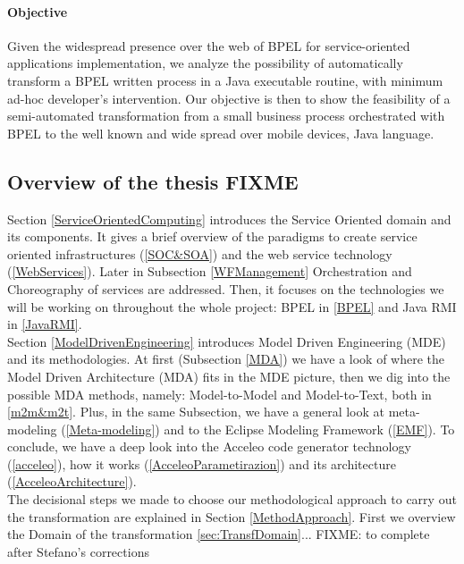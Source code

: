 \paragraph{Objective}
Given the widespread presence over the web of BPEL for service-oriented applications implementation, we analyze the possibility of automatically transform a BPEL written process in a Java executable routine, with minimum ad-hoc developer's intervention.
Our objective is then to show the feasibility of a semi-automated transformation from a small business process orchestrated with BPEL to the well known and wide spread over mobile devices, Java language. 




\subsection{Overview of the thesis FIXME}
Section \ref{ServiceOrientedComputing} introduces the Service Oriented domain and its components. It gives a brief overview of the paradigms to create service oriented infrastructures (\ref{SOC&SOA}) and the web service technology (\ref{WebServices}). Later in Subsection \ref{WFManagement} Orchestration and Choreography of services are addressed. Then, it focuses on the technologies we will be working on throughout the whole project: BPEL in \ref{BPEL} and Java RMI in \ref{JavaRMI}. \\
Section \ref{ModelDrivenEngineering} introduces Model Driven Engineering (MDE) and its methodologies. At first (Subsection \ref{MDA}) we have a look of where the Model Driven Architecture (MDA) fits in the MDE picture, then we dig into the possible MDA methods, namely: Model-to-Model and Model-to-Text, both in \ref{m2m&m2t}. Plus, in the same Subsection, we have a general look at meta-modeling (\ref{Meta-modeling}) and to the Eclipse Modeling Framework (\ref{EMF}). To conclude, we have a deep look into the Acceleo code generator technology (\ref{acceleo}), how it works (\ref{AcceleoParametirazion}) and its architecture (\ref{AcceleoArchitecture}). \\
The decisional steps we made to choose our methodological approach to carry out the transformation are explained in Section \ref{MethodApproach}. First we overview the Domain of the transformation \ref{sec:TransfDomain}...
FIXME: to complete after Stefano's corrections

